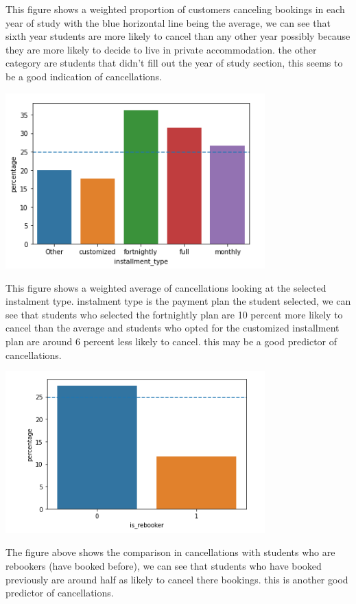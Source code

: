   This figure shows a weighted proportion of customers canceling bookings in each year of study with the blue horizontal line being the average, we can see that sixth year students are more likely to cancel than any other year possibly because they are more likely to decide to live in private accommodation. the other category are students that didn't fill out the year of study section, this seems to be a good indication of cancellations.
  
  \includegraphics[width=10cm]{figures/instalment_type.png}
  
  This figure shows a weighted average of cancellations looking at the selected instalment type. instalment type is the payment plan the student selected, we can see that students who selected the fortnightly plan are 10 percent more likely to cancel than the average and students who opted for the customized installment plan are around 6 percent less likely to cancel. this may be a good predictor of cancellations.
  
  \includegraphics[width=10cm]{figures/is_rebooker.png}
  
  The figure above shows the comparison in cancellations with students who are rebookers (have booked before), we can see that students who have booked previously are around half as likely to cancel there bookings. this is another good predictor of cancellations.  
  

